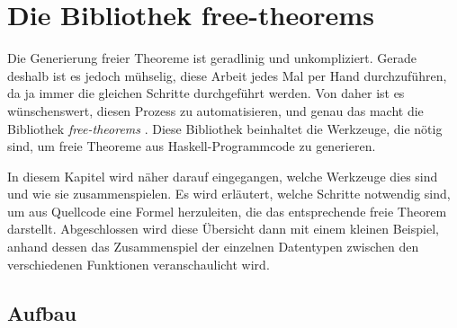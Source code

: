 \section{Die Bibliothek free-theorems}

\label{sec:free-theorems}

Die Generierung freier Theoreme ist geradlinig und unkompliziert. Gerade deshalb ist es jedoch mühselig, diese Arbeit jedes
Mal per Hand durchzuführen, da ja immer die gleichen Schritte durchgeführt werden. Von daher ist es wünschenswert, diesen
Prozess zu automatisieren, und genau das macht die Bibliothek \textit{free-theorems} \cite{freetheorems}. Diese Bibliothek
beinhaltet die Werkzeuge, die nötig sind, um freie Theoreme aus Haskell-Programmcode zu generieren.

In diesem Kapitel wird näher darauf eingegangen, welche Werkzeuge dies sind und wie sie zusammenspielen. Es wird erläutert,
welche Schritte notwendig sind, um aus Quellcode eine Formel herzuleiten, die das entsprechende freie Theorem darstellt.
Abgeschlossen wird diese Übersicht dann mit einem kleinen Beispiel, anhand dessen das Zusammenspiel der einzelnen
Datentypen zwischen den verschiedenen Funktionen veranschaulicht wird.




\subsection{Aufbau}

